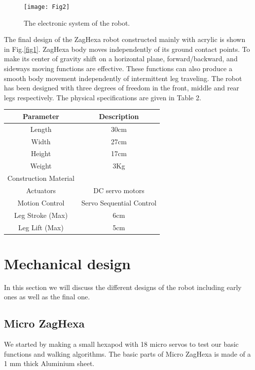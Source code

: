 \begin{figure}[H]
	\centering
	\texttt{[image: Fig2]}
	\caption{ The electronic system of the robot.}
	\label{fig4}
\end{figure}

The final design of the ZagHexa robot constructed mainly with acrylic is shown in Fig.\ref{fig1}. ZagHexa body moves independently of its ground contact points. To make its center of gravity shift on a horizontal plane, forward/backward, and sideways moving functions are effective. These functions can also produce a smooth body movement independently of intermittent leg traveling. The robot has been designed with three degrees of freedom in the front, middle and rear legs respectively. The physical specifications are given in Table 2.
\begin{center}
\begin{tabular}{|c|c|}
    \hline
    Parameter       &       Description        \\ \hline
    Length         &           30cm           \\ \hline
    Width         &           27cm           \\ \hline
    Height         &           17cm           \\ \hline
    Weight         &           3Kg            \\ \hline
    Construction Material &                          \\ \hline
    Actuators       &     DC servo motors      \\ \hline
    Motion Control     & Servo Sequential Control \\ \hline
    Leg Stroke (Max)    &           6cm            \\ \hline
    Leg Lift (Max)     &           5cm            \\ \hline
\end{tabular}
\end{center}
\noindent
\section{Mechanical design}
\noindent In this section we will discuss the different designs of the robot including early ones as well as the final one.
\subsection{Micro ZagHexa}
We started by making a small hexapod with 18 micro servos to test our basic functions and walking algorithms. The basic parts of Micro ZagHexa is made of a 1 mm thick Aluminium sheet.

